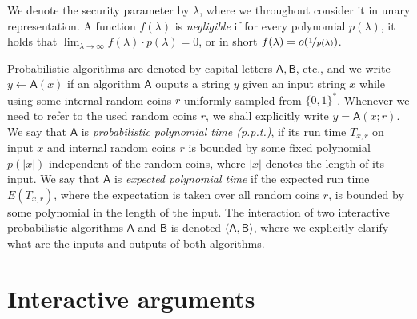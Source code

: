 \documentclass[10pt,article,oneside]{memoir}
\theoremstyle{definition}
\theoremstyle{remark}
\begin{document}
We denote the security parameter by $\lambda$, where we throughout consider it in unary representation. 
A function $f(\lambda)$ is \textit{negligible} if for every polynomial $p(\lambda)$, it holds that $\lim_{\lambda\rightarrow\infty}f(\lambda)\cdot p(\lambda)= 0$, or in short $f(\lambda)=o(\nicefrac{1}{p(\lambda)})$. 


Probabilistic algorithms are denoted by capital letters $\mathsf A, \mathsf B$, etc., and we write $y\leftarrow \mathsf A(x)$ if an algorithm $\mathsf A$ ouputs a string $y$ given an input string $x$ while using some internal random coins $r$ uniformly sampled from $\{0,1\}^*$.
Whenever we need to refer to the used random coins $r$, we shall explicitly write $y=\mathsf A(x;r)$. 
We say that $\mathsf A$ is \textit{probabilistic polynomial time (p.p.t.)}, if its run time $T_{x,r}$ on input $x$ and internal random coins $r$ is bounded by some fixed polynomial $p(|x|)$ independent of the random coins, where $|x|$ denotes the length of its input.
We say that $\mathsf A$ is \textit{expected polynomial time} if the expected run time $E(T_{x,r})$, where the expectation is taken over all random coins $r$, is bounded by some polynomial in the length of the input.
The interaction of two interactive probabilistic algorithms $\mathsf A$ and $\mathsf B$ is denoted $\langle \mathsf A, \mathsf B\rangle$, where we explicitly clarify what are the inputs and outputs of both algorithms. 




\section{Interactive arguments}
\label{s:ArgumentSystems}
\end{document}
